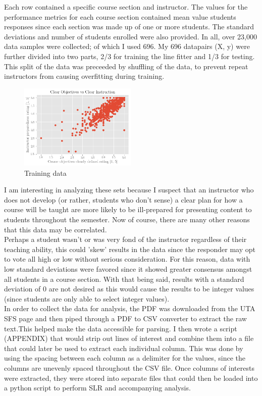 \documentclass[10pt]{report}
\begin{document}
Each row contained a specific course section and instructor. The values for the performance metrics for each course section
contained mean value students responses since each section was made up of one or more students. The standard deviations 
and number of students enrolled were also provided. In all, over 23,000 data samples were collected; of which I used 696.
My 696 datapairs (X, y) were further divided into two parts, 2/3 for training the line fitter and 1/3 for testing. This 
split of the data was preceeded by shuffling of the data, to prevent repeat instructors from causing overfitting 
during training. 

\begin{figure}
    \centering
    \includegraphics[width=0.50\textwidth]{results/first_plot}
    \caption{Training data}
\end{figure}

\vspace{5mm}

I am interesting in analyzing these sets because I suspect that an instructor who does not develop (or rather, students who 
don't sense) a clear plan for how a course will be taught are more likely to be ill-prepared for presenting 
content to students throughout the semester. Now of course, there are many other reasons that this data may be correlated. \\ 
Perhaps a student wasn't or was very fond of the instructor regardless of their teaching ability, this could 'skew' results
in the data since the responder may opt to vote all high or low without serious consideration. 
For this reason, data with low standard deviations were favored since it showed greater consensus amongst all
students in a course section. With that being said, results with a standard deviation of 0 are not desired as this would cause the 
results to be integer values (since students are only able to select integer values). \\

In order to collect the data for analysis, the PDF was downloaded from the UTA SFS page and then piped through a PDF to CSV
converter to extract the raw text.This helped make the data accessible for parsing. I then wrote a script (APPENDIX) that would strip out
lines of interest and combine them into a file that could later be used to extract each individual column. This was done
by using the spacing between each column as a delimiter for the values, since the columns are unevenly spaced throughout
the CSV file. Once columns of interests were extracted, they were stored into separate files that could then be loaded into
a python script to perform SLR and accompanying analysis.
\end{document}
